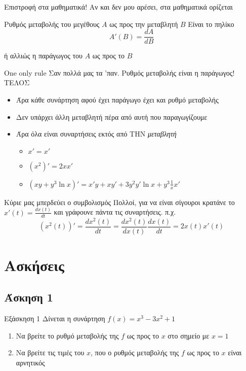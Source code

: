 \documentclass[greek]{beamer}
\begin{document}
\begin{frame}{Επιστροφή στα μαθηματικά!}
 Αν και δεν μου αρέσει, στα μαθηματικά ορίζεται
 \begin{block}{Ρυθμός μεταβολής του μεγέθους $A$ ως προς την μεταβλητή $B$}
  Είναι το πηλίκο
  $$Α'(Β)=\frac{dA}{dΒ}$$
 \end{block}
 ή αλλιώς η παράγωγος του $Α$ ως προς το $Β$
\end{frame}

\begin{frame}{One only rule}
 Σαν πολλά μας τα 'παν. Ρυθμός μεταβολής είναι η παράγωγος! ΤΕΛΟΣ
 \begin{itemize}
  \item<2-> Άρα κάθε συνάρτηση αφού έχει παράγωγο έχει και ρυθμό μεταβολής
  \item<3-> Δεν υπάρχει άλλη μεταβλητή πέρα από αυτή που παραγωγίζουμε
  \item<4-> Άρα όλα είναι συναρτήσεις εκτός από ΤΗΝ \emph{μεταβλητή}
   \begin{itemize}
    \item<5-> $x'=x'$
    \item<6-> $(x^2)'=2xx'$
    \item<7-> $(xy+y^3\ln x)'=x'y+xy'+3y^2y'\ln x+y^3\frac{1}{x}x'$
   \end{itemize}
 \end{itemize}
\end{frame}

\begin{frame}{Κύριε μας μπερδεύει ο συμβολισμός}
 Πολλοί, για να είναι σίγουροι κρατάνε το $x'(t)=\frac{dx(t)}{dt}$ και γράφουνε πάντα τις συναρτήσεις. π.χ.
 $$(x^2(t))'=\frac{dx^2(t)}{dt}=\frac{dx^2(t)}{dx(t)}\frac{dx(t)}{dt}=2x(t)x'(t)$$
\end{frame}

\section{Ασκήσεις}
\subsection{Άσκηση 1}
\begin{frame}[label=Άσκηση1]{Εξάσκηση 1}
 Δίνεται η συνάρτηση $f(x)=x^3-3x^2+1$
 \begin{enumerate}
  \item<1-> Να βρείτε το ρυθμό μεταβολής της $f$ ως προς το $x$ στο σημείο με $x=1$
  \item<2-> Να βρείτε τις τιμές του $x$, που ο ρυθμός μεταβολής της $f$ ως προς το $x$ είναι αρνητικός
 \end{enumerate}

\end{frame}
\end{document}
